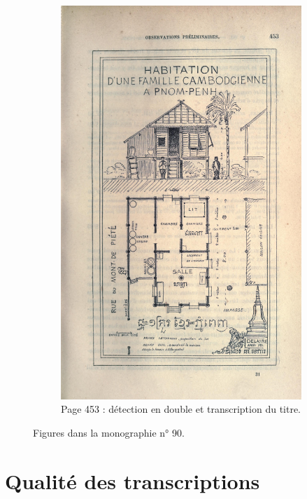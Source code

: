 \begin{figure}
\begin{subfigure}{0.4\textwidth}
     \includegraphics[width=1\linewidth]{img/odm90_453.jpg}
     \caption{Page 453 : détection en double et transcription du titre.}
     \label{fig:odmfig90453}
    \end{subfigure}
    \caption{Figures dans la monographie n° 90.}
    \label{fig:odmfig90}
\end{figure}



\chapter{Qualité des transcriptions}

